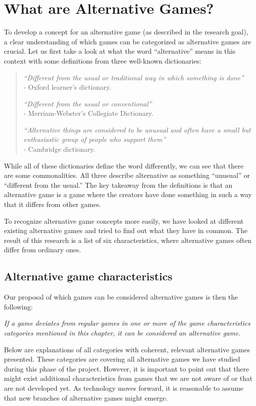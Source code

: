 \documentclass[../Main.tex]{subfiles}
\begin{document}
\section{What are Alternative Games?}
\label{chap:5}
To develop a concept for an alternative game (as described in the research goal), a clear understanding of which games can be categorized as alternative games are crucial. Let us first take a look at what the word “alternative” means in this context with some definitions from three well-known dictionaries:

\blockquote{
    \textit{“Different from the usual or traditional way in which something is done”} \\
    - Oxford learner's dictionary.
    
    \textit{“Different from the usual or conventional”} \\
    - Merriam-Webster's Collegiate Dictionary.
     
    \textit{“Alternative things are considered to be unusual and often have a small but enthusiastic group of people who support them”} \\
    - Cambridge dictionary.
}

While all of these dictionaries define the word differently, we can see that there are some commonalities. All three describe alternative as something “unusual” or “different from the usual.” The key takeaway from the definitions is that an alternative game is a game where the creators have done something in such a way that it differs from other games.

To recognize alternative game concepts more easily, we have looked at different existing alternative games and tried to find out what they have in common. The result of this research is a list of six characteristics, where alternative games often differ from ordinary ones.

\subsection{Alternative game characteristics}
Our proposal of which games can be considered alternative games is then the following:

\textit{If a game deviates from regular games in one or more of the game characteristics categories mentioned in this chapter, it can be considered an alternative game.}

Below are explanations of all categories with coherent, relevant alternative games presented. These categories are covering all alternative games we have studied during this phase of the project. However, it is important to point out that there might exist additional characteristics from games that we are not aware of or that are not developed yet. As technology moves forward, it is reasonable to assume that new branches of alternative games might emerge.
\end{document}

